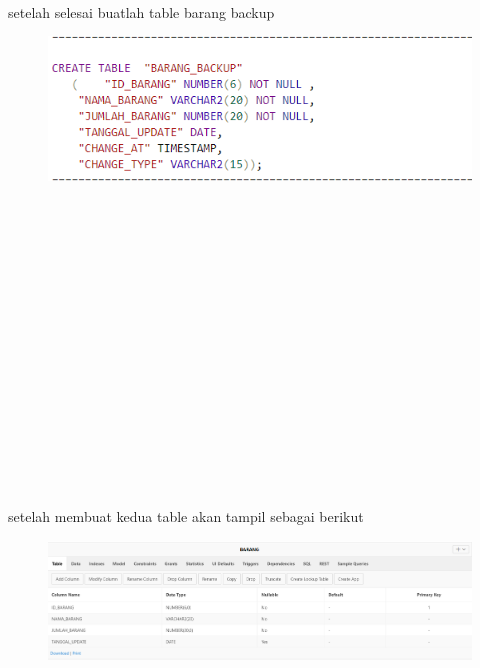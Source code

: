 \documentclass{article}
\begin{document}
\\
\\
\\
\\
\\
\\
\par setelah selesai buatlah table barang backup
\begin{figure}[h]
\includegraphics[scale=0.3]{img/5.PNG}
\end{figure}
\\
\\
\\
\\
\\
\\
\\
\\
\\
\\
\\
\\
\\
\\
\\
\par setelah membuat kedua table akan tampil sebagai berikut
\begin{figure}[h]
\includegraphics[scale=0.3]{img/9.PNG}
\end{figure}
\\
\\
\\
\\
\\
\\
\\
\\
\end{document}
